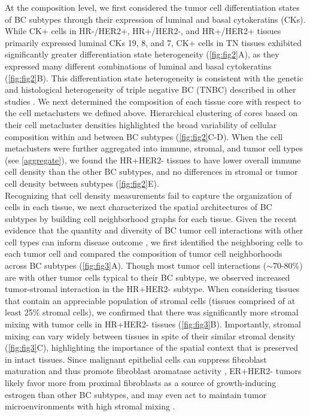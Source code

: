 \documentclass[preprint,review,3p,12pt]{elsarticle}
\begin{document}
At the composition level, we first considered the tumor cell differentiation states of BC subtypes through their expression of luminal and basal cytokeratins (CKs). While CK+ cells in HR-/HER2+, HR+/HER2-, and HR+/HER2+ tissues primarily expressed luminal CKs 19, 8, and 7, CK+ cells in TN tissues exhibited significantly greater differentiation state heterogeneity (\autoref{fig:fig2}A), as they expressed many different combinations of luminal and basal cytokeratins (\autoref{fig:fig2}B). This differentiation state heterogeneity is consistent with the genetic and histological heterogeneity of triple negative BC (TNBC) described in other studies \cite{haupt2010, tnbc2016}. We next determined the composition of each tissue core with respect to the cell metaclusters we defined above. Hierarchical clustering of cores based on their cell metacluster densities highlighted the broad variability of cellular composition within and between BC subtypes (\autoref{fig:fig2}C-D). When the cell metaclusters were further aggregated into immune, stromal, and tumor cell types (see \autoref{aggregate}), we found the HR+HER2- tissues to have lower overall immune cell density than the other BC subtypes, and no differences in stromal or tumor cell density between subtypes (\autoref{fig:fig2}E). \\

Recognizing that cell density measurements fail to capture the organization of cells in each tissue, we next characterized the spatial architectures of BC subtypes by building cell neighborhood graphs for each tissue. Given the recent evidence that the quantity and diversity of BC tumor cell interactions with other cell types can inform disease outcome \cite{jackson_single-cell_2020,keren2018}, we first identified the neighboring cells to each tumor cell and compared the composition of tumor cell neighborhoods across BC subtypes (\autoref{fig:fig3}A). Though most tumor cell interactions ($\sim$70-80\%) are with other tumor cells typical to their BC subtype, we observed increased tumor-stromal interaction in the HR+HER2- subtype. When considering tissues that contain an appreciable population of stromal cells (tissues comprised of at least 25\% stromal cells), we confirmed that there was significantly more stromal mixing with tumor cells in HR+HER2- tissues (\autoref{fig:fig3}B). Importantly, stromal mixing can vary widely between tissues in spite of their similar stromal density (\autoref{fig:fig3}C), highlighting the importance of the spatial context that is preserved in intact tissues. Since malignant epithelial cells can suppress fibroblast maturation and thus promote fibroblast aromatase activity \cite{bulun2012}, ER+HER2- tumors likely favor more from proximal fibroblasts as a source of growth-inducing estrogen than other BC subtypes, and may even act to maintain tumor microenvironments with high stromal mixing \cite{brechbuhl2017}. \\
\end{document}

